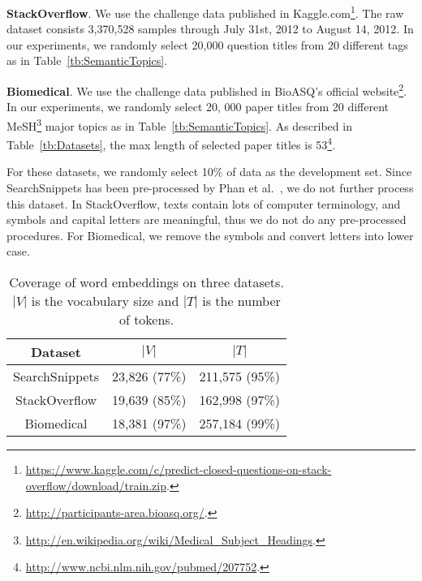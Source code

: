 \documentclass[review]{elsarticle}
\begin{document}
{\bf{StackOverflow}}. We use the challenge data published in Kaggle.com\footnote{\url{https://www.kaggle.com/c/predict-closed-questions-on-stack-overflow/download/train.zip}.}. The raw dataset consists 3,370,528 samples through July 31st, 2012 to August 14, 2012. In our experiments, we randomly select 20,000 question titles from 20 different tags as in Table~\ref{tb:SemanticTopics}.

{\bf{Biomedical}}. We use the challenge data published in BioASQ's official website\footnote{\url{http://participants-area.bioasq.org/}.}. In our experiments, we randomly select 20, 000 paper titles from 20 different MeSH\footnote{\url{http://en.wikipedia.org/wiki/Medical_Subject_Headings}.} major topics as in Table~\ref{tb:SemanticTopics}. As described in Table~\ref{tb:Datasets}, the max length of selected paper titles is 53\footnote{\url{http://www.ncbi.nlm.nih.gov/pubmed/207752}.}.

For these datasets, we randomly select 10\% of data as the development set. Since SearchSnippets has been pre-processed by Phan et al.~\cite{20_phan2008learning}, we do not further process this dataset. In StackOverflow, texts contain lots of computer terminology, and symbols and capital letters are meaningful, thus we do not do any pre-processed procedures. For Biomedical, we remove the symbols and convert letters into lower case.



\begin{table}[t] \begin{center}
\begin{tabular}{|c|c|c|}\hline
      Dataset           &	$|V|$  &	$|T|$       \\\hline \hline
SearchSnippets&23,826 (77\%) &	211,575 (95\%)\\
StackOverflow&	19,639 (85\%)  &	162,998 (97\%) \\
Biomedical&18,381 (97\%) & 257,184 (99\%)\\\hline
\end{tabular}
\end{center}
\caption{\label{tb:Embeddings} Coverage of word embeddings on three datasets. $|V|$ is the vocabulary size and $|T|$ is the number of tokens.}
\end{table}
\end{document}
